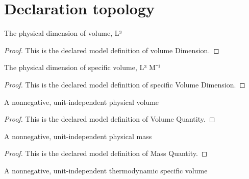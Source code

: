 \section{Declaration topology}
\begin{definition}
  \label{def:physics:phyx-mini-0397:phyxminiproblems-problemphyxmini0397-volumedimension}
  The physical dimension of volume, L³
\end{definition}
\begin{proof}
  This is the declared model definition of volume Dimension.
\end{proof}
\begin{definition}
  \label{def:physics:phyx-mini-0397:phyxminiproblems-problemphyxmini0397-specificvolumedimension}
  The physical dimension of specific volume, L³ M⁻¹
\end{definition}
\begin{proof}
  This is the declared model definition of specific Volume Dimension.
\end{proof}
\begin{definition}
  \label{def:physics:phyx-mini-0397:phyxminiproblems-problemphyxmini0397-volumequantity}
  A nonnegative, unit-independent physical volume
\end{definition}
\begin{proof}
  This is the declared model definition of Volume Quantity.
\end{proof}
\begin{definition}
  \label{def:physics:phyx-mini-0397:phyxminiproblems-problemphyxmini0397-massquantity}
  A nonnegative, unit-independent physical mass
\end{definition}
\begin{proof}
  This is the declared model definition of Mass Quantity.
\end{proof}
\begin{definition}
  \label{def:physics:phyx-mini-0397:phyxminiproblems-problemphyxmini0397-specificvolumequantity}
  A nonnegative, unit-independent thermodynamic specific volume
\end{definition}
